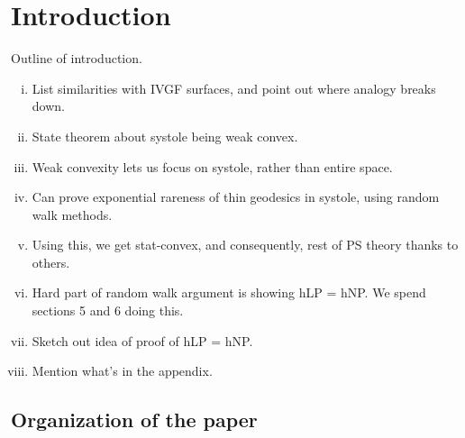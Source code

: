 \section{Introduction}
\label{sec:introduction}

{\color{red} Outline of introduction.}
\begin{enumerate}[(i)]
\item List similarities with IVGF surfaces, and point out where analogy breaks down.
\item State theorem about systole being weak convex.
\item Weak convexity lets us focus on systole, rather than entire space.
\item Can prove exponential rareness of thin geodesics in systole, using random walk methods.
\item Using this, we get stat-convex, and consequently, rest of PS theory thanks to others.
\item Hard part of random walk argument is showing hLP = hNP. We spend sections 5 and 6 doing this.
\item Sketch out idea of proof of hLP = hNP.
\item Mention what's in the appendix.
\end{enumerate}
\subsection*{Organization of the paper}


\tableofcontents


